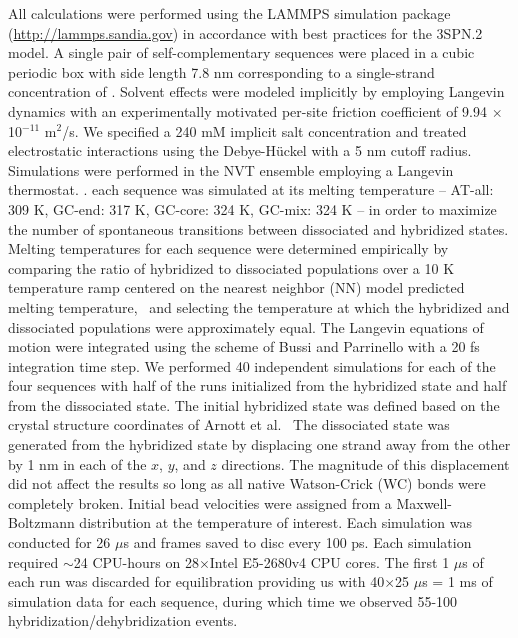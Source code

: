 \documentclass[journal=jpcbfk,manuscript=article]{achemso}
\newcommand*{\rood}[1]{{\color{red}{#1}}}
\begin{document}
All calculations were performed using the LAMMPS simulation package (\url{http://lammps.sandia.gov}) in accordance with best practices for the 3SPN.2 model. \citep{Plimpton1997FastDynamics} A single pair of self-complementary sequences were placed in a cubic periodic box with side length 7.8 nm corresponding to a single-strand concentration of \rood{7 mM}. \rood{This concentration is only 3.5$\times$ larger than the 2 mM concentration employed in our experimental analyses (Section 2.2).} Solvent effects were modeled implicitly by employing Langevin dynamics \citep{DunwegB.Paul1991BrownianNumbers., Bussi2007AccurateDynamics} with an experimentally motivated per-site friction coefficient of 9.94 $\times$ 10$^{-11}$ m$^2$/s. \citep{Nkodo2001DiffusionElectrophoresis, Hinckley2013AnHybridization} We specified a 240 mM implicit salt concentration and treated electrostatic interactions using the Debye-H{\"u}ckel with a 5 nm cutoff radius. \citep{Debye1923ZurElektrolyte} Simulations were performed in the NVT ensemble employing a Langevin thermostat. \citep{Schneider1978Molecular-dynamicsTransitions}. \rood{With the exception of the simulation data reported in Section 3.1 where we draw comparisons against experimental data collected over a range of temperatures,} each sequence was simulated at its melting temperature -- AT-all: 309 K, GC-end: 317 K, GC-core: 324 K, GC-mix: 324 K -- in order to maximize the number of spontaneous transitions between dissociated and hybridized states. Melting temperatures for each sequence were determined empirically by comparing the ratio of hybridized to dissociated populations over a 10 K temperature ramp centered on the nearest neighbor (NN) model predicted melting temperature,~\citep{SantaLucia1998AThermodynamics, Santalucia2004TheMotifs} and selecting the temperature at which the hybridized and dissociated populations were approximately equal. The Langevin equations of motion were integrated using the scheme of Bussi and Parrinello \citep{Bussi2007AccurateDynamics} with a 20 fs integration time step. We performed 40 independent simulations for each of the four sequences with half of the runs initialized from the hybridized state and half from the dissociated state. The initial hybridized state was defined based on the crystal structure coordinates of Arnott et al.~\citep{Arnott1976CRCBiology} The dissociated state was generated from the hybridized state by displacing one strand away from the other by 1 nm in each of the $x$, $y$, and $z$ directions. The magnitude of this displacement did not affect the results so long as all native Watson-Crick (WC) bonds were completely broken. Initial bead velocities were assigned from a Maxwell-Boltzmann distribution at the temperature of interest. Each simulation was conducted for 26 $\mu$s and frames saved to disc every 100 ps. Each simulation required $\sim$24 CPU-hours on 28$\times$Intel E5-2680v4 CPU cores. The first 1 $\mu$s of each run was discarded for equilibration providing us with 40$\times$25 $\mu$s = 1 ms of simulation data for each sequence, during which time we observed 55-100 hybridization/dehybridization events.
\end{document}
